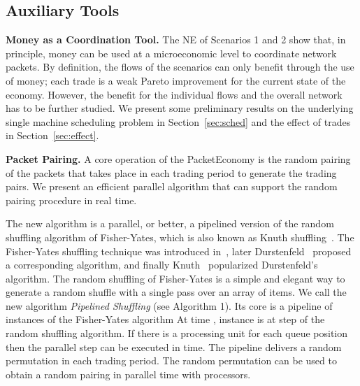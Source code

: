 \documentclass[letterpaper,10pt]{llncs}
\begin{document}
\subsection{Auxiliary Tools}

\noindent
{\bf Money as a Coordination Tool.}
The NE of Scenarios 1 and 2 show that, in principle, money can be used at a microeconomic 
level to coordinate network packets. By definition, the flows of the scenarios can only benefit through the use of money; each trade is a weak Pareto improvement for the current state of the economy.
However, the benefit for the individual flows and the overall network has to
be further studied. We present some preliminary results on the underlying single 
machine scheduling problem in Section~\ref{sec:sched} and the effect of trades in Section~\ref{sec:effect}.

\noindent
{\bf Packet Pairing.}
A core operation of the PacketEconomy is the random pairing of the packets 
that takes place in each trading period to generate the trading pairs.
We present an efficient parallel algorithm that can support the random pairing 
procedure in real time. 

The new algorithm is a parallel, or better, a pipelined version of 
the random shuffling algorithm of 
Fisher-Yates, which is also known as Knuth shuffling~\cite{wiki:2011:shuffling,Knuth:1981:Vol2}.
The Fisher-Yates shuffling technique was introduced in~\cite{Fisher:1948:Shuffle},
later Durstenfeld~\cite{Durstenfeld:1964:Shuffle} proposed a corresponding
 algorithm, and finally Knuth~\cite{Knuth:1981:Vol2} popularized
Durstenfeld's algorithm.
The random shuffling of Fisher-Yates is a simple and elegant way to generate
a random shuffle with a single pass over an array of items.
We call the new algorithm \emph{Pipelined Shuffling} (see Algorithm 1). Its core
is a pipeline of  instances  of the Fisher-Yates algorithm 
At time , instance  is at step  of the random shuffling algorithm.
If there is a processing unit for each queue position then the parallel step
can be executed in  time. The pipeline delivers a random permutation
in each trading period. The random permutation can be used to obtain a 
random pairing in  parallel time with  processors.
\end{document}
